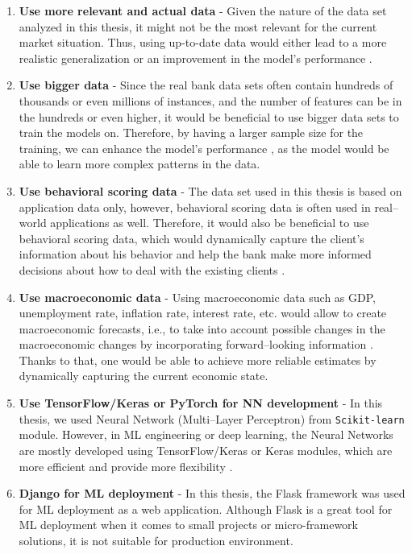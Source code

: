 \begin{enumerate}\setlength\itemsep{0em}
    \item \textbf{Use more relevant and actual data} - Given the nature of the data set analyzed in this thesis, it might not be the most relevant for the current market situation.
    Thus, using up-to-date data would either lead to a more realistic generalization \citep {kumar2021blockchain} or an improvement in the model's performance \citep{karatas2020increasing}.
    \item \textbf{Use bigger data} - Since the real bank data sets often contain hundreds of thousands or even millions of instances, and the number of features can be in the hundreds or even higher, it would be beneficial to use bigger data sets to train the models on.
    Therefore, by having a larger sample size for the training, we can enhance the model's performance \citep{ng2020influence}, as the model would be able to learn more complex patterns in the data.
    \item \textbf{Use behavioral scoring data} - The data set used in this thesis is based on application data only, however, behavioral scoring data is often used in real--world applications as well.
    Therefore, it would also be beneficial to use behavioral scoring data, which would dynamically capture the client's information about his behavior and help the bank make more informed decisions about how to deal with the existing clients \citep{li2012overview}.
    \item \textbf{Use macroeconomic data} - Using macroeconomic data such as GDP, unemployment rate, inflation rate, interest rate, etc. would allow to create macroeconomic forecasts, i.e., to take into account possible changes in the macroeconomic changes by incorporating forward--looking information \citep{jakubik2007macroeconomic}.
    Thanks to that, one would be able to achieve more reliable estimates by dynamically capturing the current economic state.
    \item \textbf{Use TensorFlow/Keras or PyTorch for NN development} - In this thesis, we used Neural Network (Multi--Layer Perceptron) from \lstinline{Scikit-learn} module. However, in ML engineering or deep learning, the Neural Networks are mostly developed using TensorFlow/Keras or Keras modules, which are more efficient and provide more flexibility \citep{gevorkyan2019review}.
    \item \textbf{Django for ML deployment} - In this thesis, the Flask framework was used for ML deployment as a web application. Although Flask is a great tool for ML deployment when it comes to small projects or micro-framework solutions, it is not suitable for production environment.

\end{enumerate}
